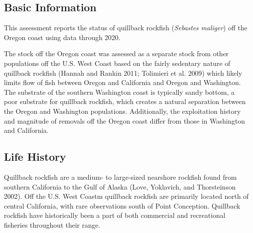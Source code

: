 \documentclass[11pt,
  english,
  a4paper,
]{article}
\begin{document}

\hypertarget{basic-information}{%
\subsection{Basic Information}\label{basic-information}}

\leavevmode\tagmcend\tagstructend


This assessment reports the status of quillback rockfish (\emph{Sebastes maliger}) off the Oregon coast using data through 2020.

\leavevmode\tagmcend\tagstructend\par


The stock off the Oregon coast was assessed as a separate stock from other populations off the U.S. West Coast based on the fairly sedentary nature of quillback rockfish {(Hannah and Rankin 2011; Tolimieri et al. 2009)\leavevmode\tagmcend\tagstructend} which likely limits flow of fish between Oregon and California and Oregon and Washington. The substrate of the southern Washington coast is typically sandy bottom, a poor substrate for quillback rockfish, which creates a natural separation between the Oregon and Washington populations. Additionally, the exploitation history and magnitude of removals off the Oregon coast differ from those in Washington and California.

\leavevmode\tagmcend\tagstructend\par


\hypertarget{life-history}{%
\subsection{Life History}\label{life-history}}

\leavevmode\tagmcend\tagstructend


Quillback rockfish are a medium- to large-sized nearshore rockfish found from southern California to the Gulf of Alaska {(Love, Yoklavich, and Thorsteinson 2002)\leavevmode\tagmcend\tagstructend}. Off the U.S. West Coastm quillback rockfish are primarily located north of central California, with rare observations south of Point Conception. Quillback rockfish have historically been a part of both commercial and recreational fisheries throughout their range.
\end{document}
